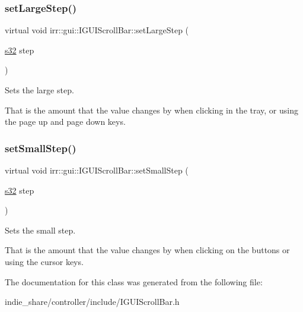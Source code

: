 \subsubsection{\texorpdfstring{set\+Large\+Step()}{setLargeStep()}}
{\footnotesize\ttfamily virtual void irr\+::gui\+::\+I\+G\+U\+I\+Scroll\+Bar\+::set\+Large\+Step (\begin{DoxyParamCaption}\item[{\hyperlink{namespaceirr_ac66849b7a6ed16e30ebede579f9b47c6}{s32}}]{step }\end{DoxyParamCaption})\hspace{0.3cm}{\ttfamily [pure virtual]}}



Sets the large step. 

That is the amount that the value changes by when clicking in the tray, or using the page up and page down keys. \mbox{\label{classirr_1_1gui_1_1IGUIScrollBar_aa85963aba6c9ac21a885fcab3eab3b20}} 
\subsubsection{\texorpdfstring{set\+Small\+Step()}{setSmallStep()}}
{\footnotesize\ttfamily virtual void irr\+::gui\+::\+I\+G\+U\+I\+Scroll\+Bar\+::set\+Small\+Step (\begin{DoxyParamCaption}\item[{\hyperlink{namespaceirr_ac66849b7a6ed16e30ebede579f9b47c6}{s32}}]{step }\end{DoxyParamCaption})\hspace{0.3cm}{\ttfamily [pure virtual]}}



Sets the small step. 

That is the amount that the value changes by when clicking on the buttons or using the cursor keys. 

The documentation for this class was generated from the following file\+:\begin{DoxyCompactItemize}
\item 
indie\+\_\+share/controller/include/I\+G\+U\+I\+Scroll\+Bar.\+h\end{DoxyCompactItemize}
